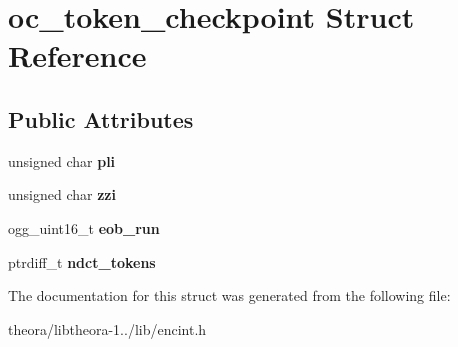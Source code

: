 \hypertarget{structoc__token__checkpoint}{\section{oc\+\_\+token\+\_\+checkpoint Struct Reference}
\label{structoc__token__checkpoint}
}
\subsection*{Public Attributes}
\begin{DoxyCompactItemize}
\item 
\hypertarget{structoc__token__checkpoint_aed5800fb42cf08b07dbef364ae8d0ea1}{unsigned char {\bfseries pli}}\label{structoc__token__checkpoint_aed5800fb42cf08b07dbef364ae8d0ea1}

\item 
\hypertarget{structoc__token__checkpoint_a9af06db9cb2807875ccb42a2d2220439}{unsigned char {\bfseries zzi}}\label{structoc__token__checkpoint_a9af06db9cb2807875ccb42a2d2220439}

\item 
\hypertarget{structoc__token__checkpoint_a7315130fe72f7244db3e19b25d3b3fdd}{ogg\+\_\+uint16\+\_\+t {\bfseries eob\+\_\+run}}\label{structoc__token__checkpoint_a7315130fe72f7244db3e19b25d3b3fdd}

\item 
\hypertarget{structoc__token__checkpoint_a435302e204a9b6b96571dacc9b7f65c9}{ptrdiff\+\_\+t {\bfseries ndct\+\_\+tokens}}\label{structoc__token__checkpoint_a435302e204a9b6b96571dacc9b7f65c9}

\end{DoxyCompactItemize}


The documentation for this struct was generated from the following file\+:\begin{DoxyCompactItemize}
\item 
theora/libtheora-\/1../lib/encint.\+h\end{DoxyCompactItemize}
